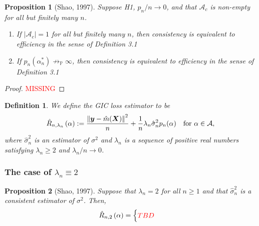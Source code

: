 \documentclass[12pt, letter paper]{article}
\newcommand{\1}{\mathmybb{1}}
\newtheorem{definition}{Definition}[section]
\newtheorem{proposition}{Proposition}[section]
\newcommand{\0}{\emptyset}
\newcommand{\prob}{\mathbb{P}}
\newcommand{\paren}[1]{\left(#1 \right)}
\newcommand{\norm}[1]{\left|\hspace{-1pt}\left|#1 \right|\hspace{-1pt}\right|}
\newcommand{\normsq}[1]{\norm{#1}^{2}}
\newcommand{\Acal}{\mathcal{A}}
\newcommand{\X}{\boldsymbol{X}}
\newcommand{\y}{\boldsymbol{y}}
\newcommand{\Rhat}[2]{\hat{R}_{n, #1}\paren{#2}}
\newcommand{\sigmahat}{\hat{\sigma}^{2}_{n}}
\begin{document}
\begin{proposition}[Shao, 1997]
    Suppose H1, \(p_{n}/n\to 0\), and that \(\Acal_{c}\) is non-empty for all but finitely many \(n\).
    \begin{enumerate}
        \item If \(|\Acal_{c}|=1\) for all but finitely many \(n\), then consistency is equivalent to efficiency in the sense of Definition 3.1
        \item If \(p_{n}(\alpha^{*}_{n})\not\to_{\prob}\infty\), then consistency is equivalent to efficiency in the sense of Definition 3.1
    \end{enumerate}
\end{proposition}
\begin{proof}
    \textcolor{red}{MISSING}
\end{proof}

\begin{definition}
    We define the GIC loss estimator to be
    \[\Rhat{\lambda_{n}}{\alpha} := \frac{\normsq{\y - \hat{m}(\X)}}{n} + \frac{1}{n}\lambda_{n}\sigmahat p_{n}(\alpha)\quad\text{for }\alpha\in\Acal,\]
    where \(\sigmahat\) is an estimator of \(\sigma^{2}\) and \(\lambda_{n}\) is a sequence of positive real numbers satisfying \(\lambda_{n}\geq 2\) and \(\lambda_{n}/n\to 0\).
\end{definition}

\subsubsection{The case of \(\lambda_{n} \equiv 2\)}

\begin{proposition}[Shao, 1997]\label{prop:97prop1}
    Suppose that \(\lambda_{n}=2\) for all \(n\geq 1\) and that \(\sigmahat\) is a consistent estimator of \(\sigma^{2}\). Then,
    \[\Rhat{2}{\alpha} = \begin{cases}
        \textcolor{red}{TBD}
    \end{cases}\]
\end{proposition}
\end{document}
